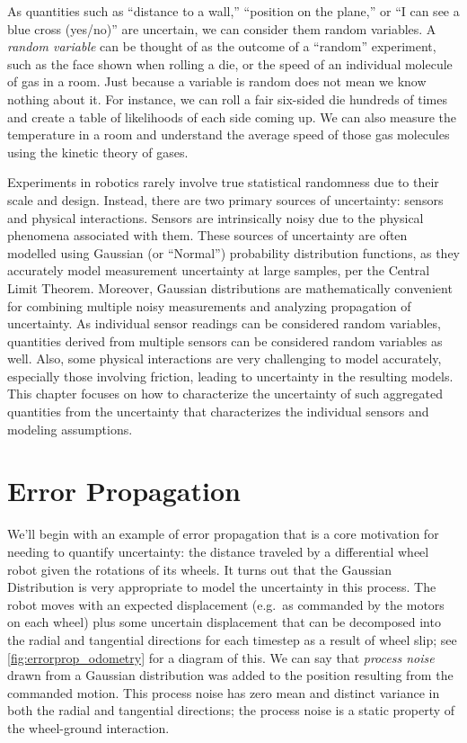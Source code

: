 As quantities such as ``distance to a wall,'' ``position on the plane,'' or ``I can see a blue cross (yes/no)'' are uncertain, we can
consider them random variables. A \textsl{random variable} can be thought of as the outcome of a ``random''
experiment, such as the face shown when rolling a die, or the speed of an individual molecule of gas in a room. Just because a
variable is random does not mean we know nothing about it. For instance, we can roll a fair six-sided die hundreds of times
and create a table of likelihoods of each side coming up. We can also measure the temperature in a room and understand the
average speed of those gas molecules using the kinetic theory of gases.

Experiments in robotics rarely involve true statistical randomness due to their scale and design. Instead, there are two primary sources
of uncertainty: sensors and physical interactions. Sensors are intrinsically noisy due to the physical phenomena associated with them.
These sources of uncertainty are often modelled using Gaussian (or ``Normal'') probability distribution functions, as they accurately model measurement uncertainty at large samples, per the Central Limit Theorem. Moreover, Gaussian distributions are mathematically convenient for combining multiple noisy measurements and analyzing propagation of uncertainty. 
As individual sensor readings can be considered random variables, quantities derived from multiple sensors can be considered random variables as well. Also, some physical interactions are very challenging to model accurately, especially those involving
friction, leading to uncertainty in the resulting models. This chapter focuses on how to characterize the uncertainty
of such aggregated quantities from the uncertainty that characterizes the individual sensors and modeling assumptions.

\section{Error Propagation}\label{sec:errorprop}
We'll begin with an example of error propagation that is a core motivation for needing to quantify uncertainty: the distance traveled by a
differential wheel robot given the rotations of its wheels. It turns out that the Gaussian Distribution is very appropriate to model the uncertainty in this process. The robot moves with an expected displacement (e.g.\ as commanded by the motors on each wheel) plus some uncertain displacement that can be decomposed into the radial and tangential directions for each timestep as a result of wheel slip; see \cref{fig:errorprop_odometry} for a diagram of this. We can say that \textsl{process noise} drawn from a Gaussian distribution was added to the position resulting from the commanded motion. This process noise has zero mean and distinct variance in both the radial and tangential directions; the process noise is a static property of the wheel-ground interaction.

